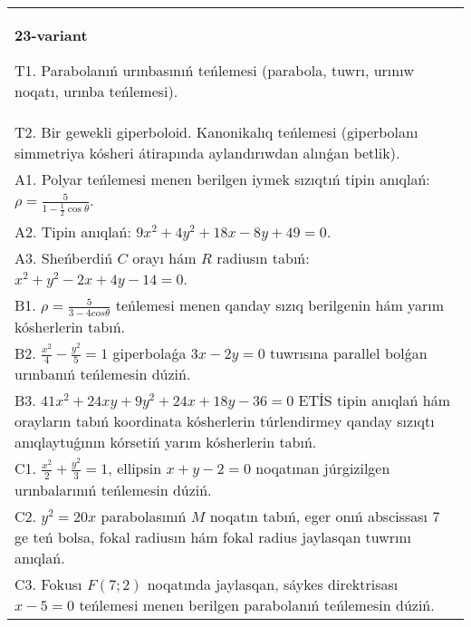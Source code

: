 \documentclass{article}
\begin{document}
\begin{tabular}{m{17cm}}
\textbf{23-variant}
\newline

T1. Parabolanıń urınbasınıń teńlemesi (parabola, tuwrı, urınıw noqatı, urınba teńlemesi).\\

T2. Bir gewekli giperboloid. Kanonikalıq teńlemesi (giperbolanı simmetriya kósheri átirapında aylandırıwdan alınǵan betlik).\\

A1. Polyar teńlemesi menen berilgen iymek sızıqtıń tipin anıqlań: $\rho=\frac{5}{1-\frac{1}{2}\cos\theta}$.\\

A2. Tipin anıqlań: $9 x^{2}+4 y^{2}+18 x-8 y+49=0$.\\

A3. Sheńberdiń $C$ orayı hám $R$ radiusın tabıń: $x^2+y^2-2 x+4 y-14=0$.\\

B1. $\rho = \frac{5}{3 - 4cos\theta}$ teńlemesi menen qanday sızıq berilgenin hám yarım kósherlerin tabıń.  \\

B2. $\frac{x^{2}}{4} - \frac{y^{2}}{5} = 1$ giperbolaǵa $3x - 2y = 0$ tuwrısına parallel bolǵan urınbanıń teńlemesin dúziń.  \\

B3. $41x^{2} + 24xy + 9y^{2} + 24x + 18y - 36 = 0$ ETİS tipin anıqlań hám orayların tabıń koordinata kósherlerin túrlendirmey qanday sızıqtı anıqlaytuǵının kórsetiń yarım kósherlerin tabıń.  \\

C1. $\frac{x^{2}}{2} + \frac{y^{2}}{3} = 1$, ellipsin $x + y - 2 = 0$ noqatınan júrgizilgen urınbalarınıń teńlemesin dúziń.  \\

C2. $y^{2} = 20x$ parabolasınıń $M$ noqatın tabıń, eger onıń abscissası 7 ge teń bolsa, fokal radiusın hám fokal radius jaylasqan tuwrını anıqlań.\\

C3. Fokusı $F(7;2)$ noqatında jaylasqan, sáykes direktrisası $x - 5 = 0$ teńlemesi menen berilgen parabolanıń teńlemesin dúziń.  \\

\end{tabular}
\vspace{1cm}
\end{document}
